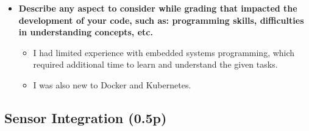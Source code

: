 \documentclass[A4,10pt]{article}
\begin{document}
\begin{itemize}
	\item \textbf{Describe any aspect to consider while grading that impacted the development of your code, such as: programming skills, difficulties in understanding concepts, etc.}
	\begin{itemize}
		\item I had limited experience with embedded systems programming, which required additional time to learn and understand the given tasks.
		\item I was also new to Docker and Kubernetes.
	\end{itemize}
\end{itemize}

\subsection{Sensor Integration (0.5p)}
\end{document}
